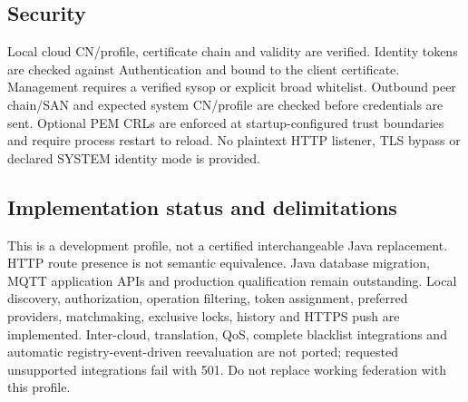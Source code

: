 \documentclass[a4paper]{arrowhead}
\begin{document}
\subsection{Security}
Local cloud CN/profile, certificate chain and validity are verified. Identity tokens are checked against Authentication and bound to the client certificate. Management requires a verified sysop or explicit broad whitelist. Outbound peer chain/SAN and expected system CN/profile are checked before credentials are sent. Optional PEM CRLs are enforced at startup-configured trust boundaries and require process restart to reload. No plaintext HTTP listener, TLS bypass or declared SYSTEM identity mode is provided.
\subsection{Implementation status and delimitations}
This is a development profile, not a certified interchangeable Java replacement. HTTP route presence is not semantic equivalence. Java database migration, MQTT application APIs and production qualification remain outstanding.
Local discovery, authorization, operation filtering, token assignment, preferred providers, matchmaking, exclusive locks, history and HTTPS push are implemented. Inter-cloud, translation, QoS, complete blacklist integrations and automatic registry-event-driven reevaluation are not ported; requested unsupported integrations fail with 501. Do not replace working federation with this profile.
\clearpage
\end{document}
